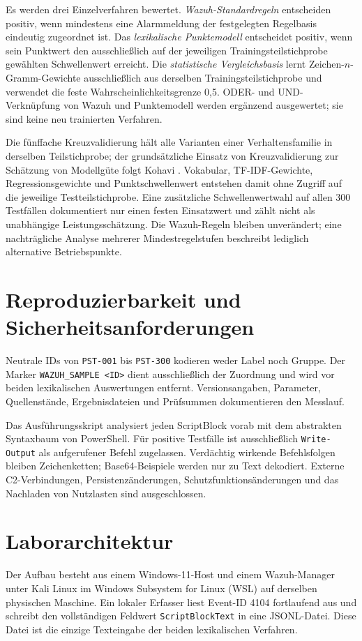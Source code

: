 \documentclass[12pt,a4paper,oneside,parskip=half]{scrreprt}
\begin{document}
Es werden drei Einzelverfahren bewertet. \emph{Wazuh-Standardregeln} entscheiden positiv, wenn mindestens eine Alarmmeldung der festgelegten Regelbasis eindeutig zugeordnet ist. Das \emph{lexikalische Punktemodell} entscheidet positiv, wenn sein Punktwert den ausschließlich auf der jeweiligen Trainingsteilstichprobe gewählten Schwellenwert erreicht. Die \emph{statistische Vergleichsbasis} lernt Zeichen-\(n\)-Gramm-Gewichte ausschließlich aus derselben Trainingsteilstichprobe und verwendet die feste Wahrscheinlichkeitsgrenze 0{,}5. ODER- und UND-Verknüpfung von Wazuh und Punktemodell werden ergänzend ausgewertet; sie sind keine neu trainierten Verfahren.

Die fünffache Kreuzvalidierung hält alle Varianten einer Verhaltensfamilie in derselben Teilstichprobe; der grundsätzliche Einsatz von Kreuzvalidierung zur Schätzung von Modellgüte folgt Kohavi \cite{kohavi1995}. Vokabular, TF-IDF-Gewichte, Regressionsgewichte und Punktschwellenwert entstehen damit ohne Zugriff auf die jeweilige Testteilstichprobe. Eine zusätzliche Schwellenwertwahl auf allen 300 Testfällen dokumentiert nur einen festen Einsatzwert und zählt nicht als unabhängige Leistungsschätzung. Die Wazuh-Regeln bleiben unverändert; eine nachträgliche Analyse mehrerer Mindestregelstufen beschreibt lediglich alternative Betriebspunkte.
\section{Reproduzierbarkeit und Sicherheitsanforderungen}
Neutrale IDs von \texttt{PST-001} bis \texttt{PST-300} kodieren weder Label noch Gruppe. Der Marker \texttt{WAZUH\_SAMPLE <ID>} dient ausschließlich der Zuordnung und wird vor beiden lexikalischen Auswertungen entfernt. Versionsangaben, Parameter, Quellenstände, Ergebnisdateien und Prüfsummen dokumentieren den Messlauf.

Das Ausführungsskript analysiert jeden ScriptBlock vorab mit dem abstrakten Syntaxbaum von PowerShell. Für positive Testfälle ist ausschließlich \texttt{Write-Output} als aufgerufener Befehl zugelassen. Verdächtig wirkende Befehlsfolgen bleiben Zeichenketten; Base64-Beispiele werden nur zu Text dekodiert. Externe C2-Verbindungen, Persistenzänderungen, Schutzfunktionsänderungen und das Nachladen von Nutzlasten sind ausgeschlossen.

\section{Laborarchitektur}
Der Aufbau besteht aus einem Windows-11-Host und einem Wazuh-Manager unter Kali Linux im Windows Subsystem for Linux (WSL) auf derselben physischen Maschine. Ein lokaler Erfasser liest Event-ID 4104 fortlaufend aus  und schreibt den vollständigen Feldwert \texttt{ScriptBlockText} in eine JSONL-Datei. Diese Datei ist die einzige Texteingabe der beiden lexikalischen Verfahren.
\end{document}
